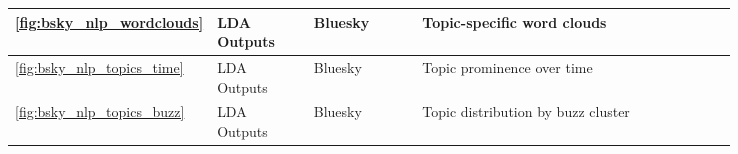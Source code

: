 \begin{longtable}{|p{0.05\linewidth}|p{0.14\linewidth}|p{0.16\linewidth}|p{0.43\linewidth}|p{0.06\linewidth}|}
\textcolor{textmuted}{\small\ref{fig:bsky_nlp_wordclouds}}         & \textcolor{textmuted}{\small LDA Outputs}         & \textcolor{textmuted}{\small Bluesky}         & \textcolor{textmuted}{\small Topic-specific word clouds}               & \textcolor{textmuted}{\small\pageref{fig:bsky_nlp_wordclouds}} \\\hline
\textcolor{textmuted}{\small\ref{fig:bsky_nlp_topics_time}}        & \textcolor{textmuted}{\small LDA Outputs}         & \textcolor{textmuted}{\small Bluesky}         & \textcolor{textmuted}{\small Topic prominence over time}               & \textcolor{textmuted}{\small\pageref{fig:bsky_nlp_topics_time}} \\\hline
\textcolor{textmuted}{\small\ref{fig:bsky_nlp_topics_buzz}}        & \textcolor{textmuted}{\small LDA Outputs}         & \textcolor{textmuted}{\small Bluesky}         & \textcolor{textmuted}{\small Topic distribution by buzz cluster}       & \textcolor{textmuted}{\small\pageref{fig:bsky_nlp_topics_buzz}} \\\hline


\end{longtable}
